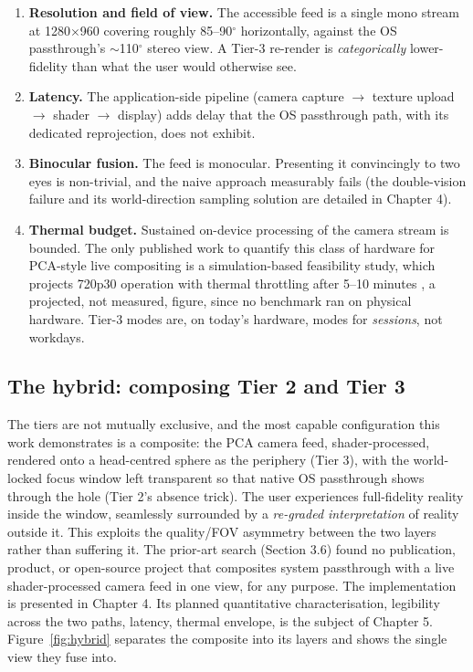 \begin{enumerate}
\item \textbf{Resolution and field of view.} The accessible feed is a single mono stream at 1280$\times$960
covering roughly 85–90$^{\circ}$ horizontally, against the OS passthrough's $\sim$110$^{\circ}$ stereo view. A Tier-3
re-render is \textit{categorically} lower-fidelity than what the user would otherwise see.
\item \textbf{Latency.} The application-side pipeline (camera capture $\rightarrow$ texture upload $\rightarrow$ shader $\rightarrow$ display)
adds delay that the OS passthrough path, with its dedicated reprojection, does not exhibit.
\item \textbf{Binocular fusion.} The feed is monocular. Presenting it convincingly to two eyes is
non-trivial, and the naive approach measurably fails (the double-vision failure and its
world-direction sampling solution are detailed in Chapter 4).
\item \textbf{Thermal budget.} Sustained on-device processing of the camera stream is bounded. The only
published work to quantify this class of hardware for PCA-style live compositing is a
simulation-based feasibility study, which projects 720p30 operation with thermal throttling after
5–10 minutes \citep{laghari2025}, a projected, not measured, figure, since no benchmark ran on
physical hardware. Tier-3 modes are, on today's hardware, modes for \textit{sessions}, not workdays.
\end{enumerate}

\subsection{The hybrid: composing Tier 2 and Tier 3}

The tiers are not mutually exclusive, and the most capable configuration this work demonstrates is a
composite: the PCA camera feed, shader-processed, rendered onto a head-centred sphere as the
periphery (Tier 3), with the world-locked focus window left transparent so that native OS passthrough
shows through the hole (Tier 2's absence trick). The user experiences full-fidelity reality inside
the window, seamlessly surrounded by a \textit{re-graded interpretation} of reality outside it. This
exploits the quality/FOV asymmetry between the two layers rather than suffering it. The prior-art
search (Section 3.6) found no publication, product, or open-source project that composites system
passthrough with a live shader-processed camera feed in one view, for any purpose. The implementation
is presented in Chapter 4. Its planned quantitative characterisation, legibility across the two
paths, latency, thermal envelope, is the subject of Chapter 5. Figure~\ref{fig:hybrid} separates the
composite into its layers and shows the single view they fuse into.

